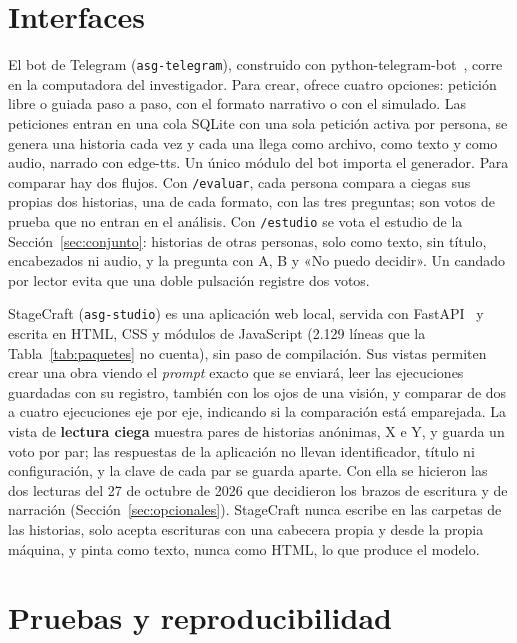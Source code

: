 \section{Interfaces}\label{sec:interfaces}

El bot de Telegram (\texttt{asg-telegram}), construido con python-telegram-bot~\cite{ptb2026}, corre
en la computadora del investigador. Para crear, ofrece cuatro opciones: petición libre o guiada paso
a paso, con el formato narrativo o con el simulado. Las peticiones entran en una cola SQLite con una
sola petición activa por persona, se genera una historia cada vez y cada una llega como archivo,
como texto y como audio, narrado con edge-tts. Un único módulo del bot importa el generador. Para
comparar hay dos flujos. Con \texttt{/evaluar}, cada persona compara a ciegas sus propias dos
historias, una de cada formato, con las tres preguntas; son votos de prueba que no entran en el
análisis. Con \texttt{/estudio} se vota el estudio de la Sección~\ref{sec:conjunto}: historias de
otras personas, solo como texto, sin título, encabezados ni audio, y la pregunta con A, B y «No
puedo decidir». Un candado por lector evita que una doble pulsación registre dos votos.

StageCraft (\texttt{asg-studio}) es una aplicación web local, servida con FastAPI~\cite{fastapi2026}
y escrita en HTML, CSS y módulos de JavaScript (2.129 líneas que la Tabla~\ref{tab:paquetes} no
cuenta), sin paso de compilación. Sus vistas permiten crear
una obra viendo el \textit{prompt} exacto que se enviará, leer las ejecuciones guardadas con su
registro, también con los ojos de una visión, y comparar de dos a cuatro ejecuciones eje por eje,
indicando si la comparación está emparejada. La vista de \textbf{lectura ciega} muestra pares de
historias anónimas, X e Y, y guarda un voto por par; las respuestas de la aplicación no llevan
identificador, título ni configuración, y la clave de cada par se guarda aparte. Con ella se hicieron
las dos lecturas del 27 de octubre de 2026 que decidieron los brazos de escritura y de narración
(Sección~\ref{sec:opcionales}). StageCraft nunca escribe en las carpetas de las historias, solo
acepta escrituras con una cabecera propia y desde la propia máquina, y pinta como texto, nunca como
HTML, lo que produce el modelo.

\section{Pruebas y reproducibilidad}\label{sec:pruebas}

